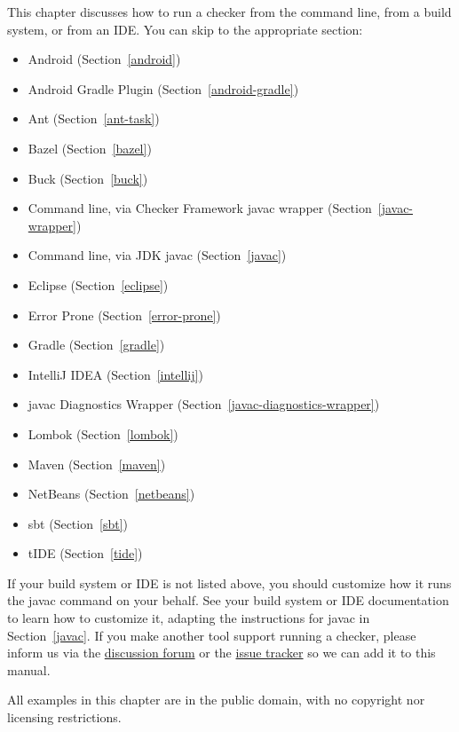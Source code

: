 \htmlhr
{}

This chapter discusses how to run a checker from the command line, from a
build system, or from an IDE\@.  You can skip to the appropriate section:

\begin{itemize}
\item Android (Section~\ref{android})
\item Android Gradle Plugin (Section~\ref{android-gradle})
\item Ant (Section~\ref{ant-task})
\item Bazel (Section~\ref{bazel})
\item Buck (Section~\ref{buck})
\item Command line, via Checker Framework javac wrapper (Section~\ref{javac-wrapper})
\item Command line, via JDK javac (Section~\ref{javac})
\item Eclipse (Section~\ref{eclipse})
\item Error Prone (Section~\ref{error-prone})
\item Gradle (Section~\ref{gradle})
\item IntelliJ IDEA (Section~\ref{intellij})
\item javac Diagnostics Wrapper (Section~\ref{javac-diagnostics-wrapper})
\item Lombok (Section~\ref{lombok})
\item Maven (Section~\ref{maven})
\item NetBeans (Section~\ref{netbeans})
\item sbt (Section~\ref{sbt})
\item tIDE (Section~\ref{tide})
\end{itemize}

If your build system or IDE is not listed above, you should customize how
it runs the javac command on your behalf.  See your build system or IDE
documentation to learn how to
customize it, adapting the instructions for javac in Section~\ref{javac}.
If you make another tool support running a checker, please
inform us via the
\href{https://github.com/eisop/checker-framework/discussions}{discussion forum} or
the \href{https://github.com/eisop/checker-framework/issues}{issue tracker} so
we can add it to this manual.

All examples in this chapter are in the public domain, with no copyright nor
licensing restrictions.


